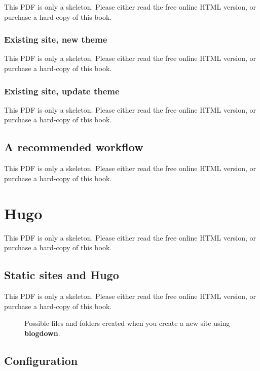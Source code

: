 \documentclass[
  12pt,
]{krantz}
\begin{document}
This PDF is only a skeleton. Please either read the free online HTML version, or purchase a hard-copy of this book.

\subsection{Existing site, new theme}\label{existing-site-new-theme}

This PDF is only a skeleton. Please either read the free online HTML version, or purchase a hard-copy of this book.

\subsection{Existing site, update theme}\label{existing-site-update-theme}

This PDF is only a skeleton. Please either read the free online HTML version, or purchase a hard-copy of this book.

\section{A recommended workflow}\label{workflow}

This PDF is only a skeleton. Please either read the free online HTML version, or purchase a hard-copy of this book.

\chapter{Hugo}\label{hugo}

This PDF is only a skeleton. Please either read the free online HTML version, or purchase a hard-copy of this book.

\section{Static sites and Hugo}\label{static-sites}

This PDF is only a skeleton. Please either read the free online HTML version, or purchase a hard-copy of this book.

\begin{figure}\caption{Possible files and folders created when you create a new site using \textbf{blogdown}.}\end{figure}

\section{Configuration}\label{configuration}
\end{document}

